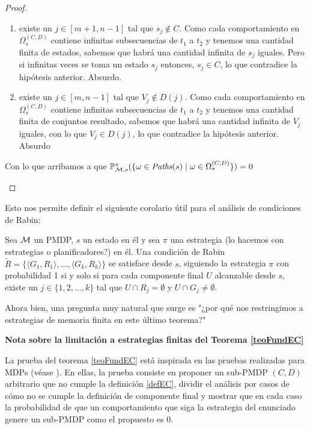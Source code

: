 \begin{proof}
\begin{itemize}
		      \begin{enumerate}
			      \item existe un $j \in [m+1, n-1]$ tal que $s_j \notin C$. Como cada comportamiento
			            en $\Omega_s^{(C,D)}$ contiene infinitas subsecuencias de $t_1$ a $t_2$ y
			            tenemos una cantidad finita de estados, sabemos que habrá una cantidad infinita
			            de $s_j$ iguales. Pero si infinitas veces se toma un estado $s_j$ entonces,
			            $s_j \in C$, lo que contradice la hipótesis anterior. Absurdo.

			      \item existe un $j \in [m, n-1]$ tal que $V_j \notin D(j)$. Como cada comportamiento
			            en $\Omega_s^{(C,D)}$ contiene infinitas subsecuencias de $t_1$ a $t_2$ y
			            tenemos una cantidad finita de conjuntos resultado, sabemos que habrá una
			            cantidad infinita de $V_j$ iguales, con lo que $V_j \in D(j)$, lo que
			            contradice la hipótesis anterior. Absurdo
		      \end{enumerate}
		      Con lo que arribamos a que $\mathbb{P}^\pi_{\mathcal{M}, s}(\{ \omega \in \textit{Paths}(s) \mid \omega \in \Omega_s^{(C,D)}\}) = 0  $
	\end{itemize}

\end{proof}

Esto nos permite definir el siguiente corolario útil para el análisis de
condiciones de Rabin:

\begin{corollary}
	\label{adaptB30}
	Sea $\mathcal{M}$ un PMDP, $s$ un estado en él y sea $\pi$ una estrategia (lo hacemos con estrategias o planificadores?) en él. Una condición de Rabin $\widetilde{R} = \{ \langle G_1, R_1 \rangle, ...,  \langle G_k, R_k \rangle \}$ se satisface desde $s$, siguiendo la estrategia $\pi$ con probabilidad 1 si y solo si para cada componente final $U$ alcanzable desde $s$, existe un $j \in \{ 1, 2, ..., k\}$ tal que $U \cap R_j = \emptyset$ y $U \cap G_j \neq \emptyset$.
\end{corollary}

Ahora bien, una pregunta muy natural que surge es "¿por qué nos restringimos a
estrategias de memoria finita en este último teorema?"

\textbf{Nota sobre la limitación a estrategias finitas del Teorema \ref{teoFundEC}}

La prueba del teorema \ref{teoFundEC} está inspirada en las pruebas realizadas
para MDPs (véase \cite{BaierKatoen} \cite{AlfaroThesis}). En ellas, la prueba
consiste en proponer un sub-PMDP $(C, D)$ arbitrario que no cumple la
definición \ref{defEC}, dividir el análisis por casos de cómo no se cumple la
definición de componente final y mostrar que en cada caso la probabilidad de
que un comportamiento que siga la estrategia del enunciado genere un sub-PMDP
como el propuesto es 0.

